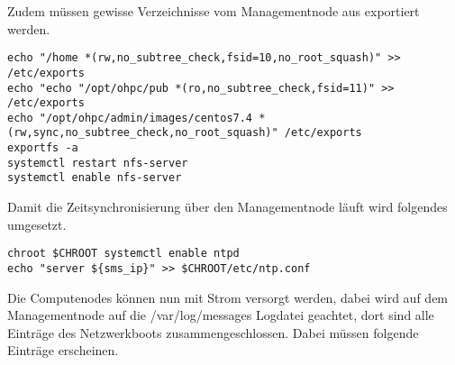 Zudem müssen gewisse Verzeichnisse vom Managementnode aus exportiert werden.

\begin{lstlisting}
echo "/home *(rw,no_subtree_check,fsid=10,no_root_squash)" >> /etc/exports
echo "echo "/opt/ohpc/pub *(ro,no_subtree_check,fsid=11)" >> /etc/exports
echo "/opt/ohpc/admin/images/centos7.4 *(rw,sync,no_subtree_check,no_root_squash)" /etc/exports
exportfs -a
systemctl restart nfs-server
systemctl enable nfs-server
\end{lstlisting}

Damit die Zeitsynchronisierung über den Managementnode läuft wird folgendes umgesetzt.

\begin{lstlisting}
chroot $CHROOT systemctl enable ntpd
echo "server ${sms_ip}" >> $CHROOT/etc/ntp.conf
\end{lstlisting}

Die Computenodes können nun mit Strom versorgt werden, dabei wird auf dem Managementnode auf die /var/log/messages Logdatei geachtet, dort sind alle Einträge des Netzwerkboots zusammengeschlossen. Dabei müssen folgende Einträge erscheinen.


